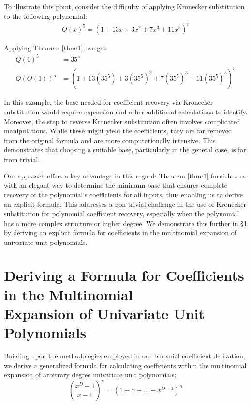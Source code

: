 \documentclass{article}
\theoremstyle{plain}
\theoremstyle{definition}
\begin{document}
To illustrate this point, consider the difficulty of applying Kronecker substitution to the following polynomial:
\begin{align}
    Q(x)^5 = (1 + 13x + 3x^2 + 7x^3 + 11x^5)^5
\end{align}

Applying Theorem \ref{thm:1}, we get:
\begin{align}
    Q(1)^5 &= 35^5 \\
    Q(Q(1))^5 &= (1 + 13(35^5) + 3(35^5)^2 + 7(35^5)^3 + 11(35^5)^5)^5
\end{align}

In this example, the base needed for coefficient recovery via Kronecker substitution would require expansion and other additional calculations to identify. Moreover, the step to reverse Kronecker substitution often involves complicated manipulations. While these might yield the coefficients, they are far removed from the original formula and are more computationally intensive. This demonstrates that choosing a suitable base, particularly in the general case, is far from trivial.

Our approach offers a key advantage in this regard: Theorem \ref{thm:1} furnishes us with an elegant way to determine the minimum base that ensures complete recovery of the polynomial's coefficients for all inputs, thus enabling us to derive an explicit formula. This addresses a non-trivial challenge in the use of Kronecker substitution for polynomial coefficient recovery, especially when the polynomial has a more complex structure or higher degree. We demonstrate this further in \S \ref{sec:multinomialformula} by deriving an explicit formula for coefficients in the multinomial expansion of univariate unit polynomials.

\section[Deriving a Formula for Coefficients in the Multinomial Expansion of Univariate Unit Polynomials]{Deriving a Formula for Coefficients in the Multinomial\\ Expansion of Univariate Unit Polynomials} \label{sec:multinomialformula}
Building upon the methodologies employed in our binomial coefficient derivation, we derive a generalized formula for calculating coefficients within the multinomial expansion of arbitrary degree univariate unit polynomials:
\begin{equation}
    \left(\frac{x^{D}-1}{x-1}\right)^n = (1 + x + \ldots + x^{D-1})^n 
\end{equation}
\end{document}
